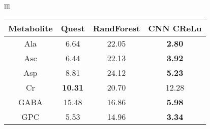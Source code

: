\documentclass{llncs}
\begin{document}
\begin{table*}
\begin{center}
\begin{tabular}{lll}
\begin{tabular}{c c c c}
\hline
Metabolite & Quest & RandForest & CNN CReLu\\[2pt]
\hline\rule{0pt}{12pt}
Ala	 &       6.64      & 22.05 	& \bf 2.80 	\\
Asc      &       6.44      & 22.13 	& \bf 3.92 	\\
Asp      &       8.81      & 24.12 	& \bf 5.23 	\\
Cr       & \bf   10.31     & 20.70 	&     12.28 	\\
GABA     &       15.48     & 16.86 	& \bf 5.98 	\\
GPC      &       5.53      & 14.96 	& \bf 3.34 	\\

\end{tabular}
\end{tabular}
\end{center}
\end{table*}
\end{document}
